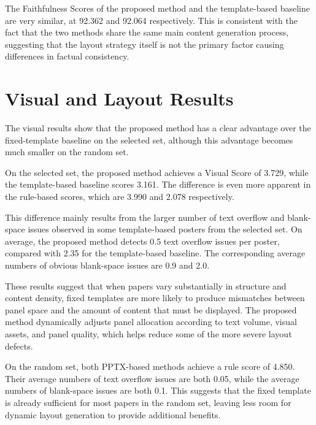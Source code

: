 \documentclass[12pt,oneside]{report}
\begin{document}
\vspace{1em}

The Faithfulness Scores of the proposed method and the template-based baseline are very similar, at 92.362 and 92.064 respectively. This is consistent with the fact that the two methods share the same main content generation process, suggesting that the layout strategy itself is not the primary factor causing differences in factual consistency.

\section{Visual and Layout Results}

The visual results show that the proposed method has a clear advantage over the fixed-template baseline on the selected set, although this advantage becomes much smaller on the random set.

\vspace{1em}

On the selected set, the proposed method achieves a Visual Score of 3.729, while the template-based baseline scores 3.161. The difference is even more apparent in the rule-based scores, which are 3.990 and 2.078 respectively.

\vspace{1em}

This difference mainly results from the larger number of text overflow and blank-space issues observed in some template-based posters from the selected set. On average, the proposed method detects 0.5 text overflow issues per poster, compared with 2.35 for the template-based baseline. The corresponding average numbers of obvious blank-space issues are 0.9 and 2.0.

\vspace{1em}

These results suggest that when papers vary substantially in structure and content density, fixed templates are more likely to produce mismatches between panel space and the amount of content that must be displayed. The proposed method dynamically adjusts panel allocation according to text volume, visual assets, and panel quality, which helps reduce some of the more severe layout defects.

\vspace{1em}

On the random set, both PPTX-based methods achieve a rule score of 4.850. Their average numbers of text overflow issues are both 0.05, while the average numbers of blank-space issues are both 0.1. This suggests that the fixed template is already sufficient for most papers in the random set, leaving less room for dynamic layout generation to provide additional benefits.
\end{document}

